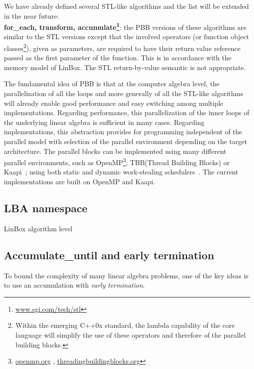 \documentclass{article}
\newcommand{\linbox}{{\sc LinBox}\xspace}
\newcommand{\kaapi}{{\sc Kaapi}\xspace}
\newcommand{\Accumulatewhile}{ \textbf{Accumulate\_until} }
\begin{document}
  We have already defined several STL-like algorithms and the list
  will be extended in the near future:\\
  {\bf for\_each, transform,
    accumulate\footnote{\url{www.sgi.com/tech/stl}}}: the PBB versions of
  these algorithms are similar to the STL versions except that the
  involved operators (or function object classes\footnote{Within the
    emerging C++0x standard, the lambda capability of the core language
    will simplify the use of these operators and therefore of the parallel
    building blocks.}), given as parameters, are required to have their
  return value reference passed as the first parameter of the
  function. This is in accordance with the memory model of \linbox. The
  STL return-by-value semantic is not appropriate.
  
  The fundamental idea of PBB is that at the computer algebra
  level, the parallelization of all the loops and more generally of all
  the STL-like algorithms will already enable good performance and
  easy switching among multiple implementations.
  Regarding performance, this parallelization of the inner loops of
  the underlying linear algebra is sufficient in many cases.
  Regarding implementations, this
  abstraction provides for programming independent of the
  parallel model with selection of the parallel environment
  depending on the target architecture.
  The parallel blocks can be implemented using many different parallel
  environments, such as
  OpenMP\footnote{\url{openmp.org} \cite{Chapman:2007:openmp},
    \url{threadingbuildingblocks.org}}; 
  TBB\footnotemark[7] (Thread Building Blocks)
   or
  \kaapi~\cite{inproceedingsgautier.gbp_ktsrsf_07}; using
  both static and dynamic work-stealing
  schedulers~\cite{con-traore.trmgb_08}.
  The current implementations are built on OpenMP and \kaapi.

\subsection{LBA namespace}
\begin{algorithm}[ht]
\caption{LinBox algorithm level}\label{alg:bbit}
\end{algorithm}


\subsection{\Accumulatewhile and early termination}
To bound the complexity of many linear algebra problems, one of the
key ideas is to use an accumulation with {\em early termination}.
\end{document}
